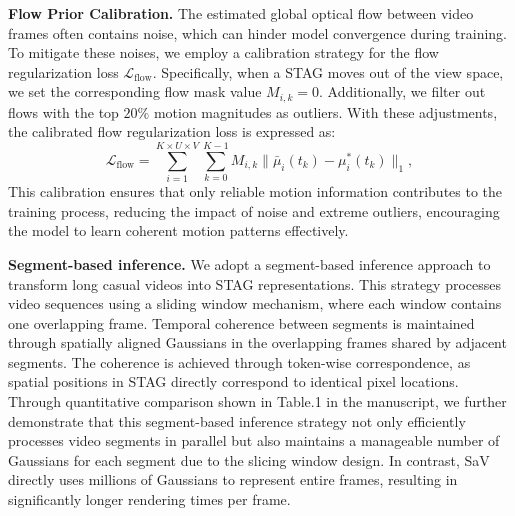 \noindent\textbf{Flow Prior Calibration.} The estimated global optical flow between video frames often contains noise, which can hinder model convergence during training. To mitigate these noises, we employ a calibration strategy for the flow regularization loss $\mathcal{L}_{\text{flow}}$. Specifically, when a STAG moves out of the view space, we set the corresponding flow mask value $M_{i, k} = 0$. Additionally, we filter out flows with the top $20\%$ motion magnitudes as outliers. With these adjustments, the calibrated flow regularization loss is expressed as:
\begin{equation}
\mathcal{L}_{\text{flow}} = \sum_{i=1}^{K \times U \times V}\sum_{k=0}^{K-1} M_{i, k}\|\bar{\mu}_{i}(t_k) - \mu^*_i(t_k)\|_1,
\label{eq:flow_cal}
\end{equation}
This calibration ensures that only reliable motion information contributes to the training process, reducing the impact of noise and extreme outliers, encouraging the model to learn coherent motion patterns effectively.



\noindent\textbf{Segment-based inference.} 
%
We adopt a segment-based inference approach to transform long casual videos into STAG representations. This strategy processes video sequences using a sliding window mechanism, where each window contains one overlapping frame. Temporal coherence between segments is maintained through spatially aligned Gaussians in the overlapping frames shared by adjacent segments. The coherence is achieved through token-wise correspondence, as spatial positions in STAG directly correspond to identical pixel locations.
%
Through quantitative comparison shown in Table.1 in the manuscript, we further demonstrate that this segment-based inference strategy not only efficiently processes video segments in parallel but also maintains a manageable number of Gaussians for each segment due to the slicing window design. In contrast, SaV~\cite{sun2024splatter} directly uses millions of Gaussians to represent entire frames, resulting in significantly longer rendering times per frame.




